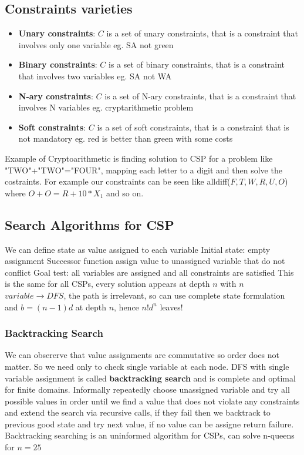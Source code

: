 \documentclass[12pt]{book}
\begin{document}
\subsection{Constraints varieties}
\begin{itemize}
	\item \textbf{Unary constraints}: $C$ is a set of unary constraints, that is a constraint that involves only one variable eg. SA not green
	\item \textbf{Binary constraints}: $C$ is a set of binary constraints, that is a constraint that involves two variables eg. SA not WA
	\item \textbf{N-ary constraints}: $C$ is a set of N-ary constraints, that is a constraint that involves N variables eg. cryptarithmetic problem
	\item \textbf{Soft constraints}: $C$ is a set of soft constraints, that is a constraint that is not mandatory eg. red is better than green with some costs
\end{itemize}

Example of Cryptoarithmetic is finding solution to CSP for a problem like "TWO"+"TWO"="FOUR", mapping each letter to a digit and then solve the costraints.
For example our constraints can be seen like alldiff($F, T, W, R, U, O$) where $O + O = R + 10*X_1$ and so on.
\newline

\subsection{Search Algorithms for CSP}

We can define state as value assigned to each variable
\newline Initial state: empty assignment 
\newline Successor function assign value to unassigned variable that do not conflict
\newline Goal test: all variables are assigned and all constraints are satisfied
This is the same for all CSPs, every solution appears at depth $n$ with $n$ $variable \rightarrow DFS$, the path is irrelevant, so can use complete state formulation and $b=(n-1)d$ at depth $n$, hence $n!d^n$ leaves!

\subsubsection{Backtracking Search}
We can obsererve that value assignments are commutative so order does not matter. So we need only to check single variable at each node.
\newline
DFS with single variable assignment is called \textbf{backtracking search} and is complete and optimal for finite domains.
Informally repeatedly choose unassigned variable and try all possible values in order until we find a value that does not violate any constraints and extend the search via recursive calls, if they fail then we backtrack to previous good state and try next value, if no value can be assigne return failure.
Backtracking searching is an uninformed algorithm for CSPs, can solve n-queens for $n = 25$
\newline
\end{document}

